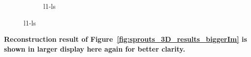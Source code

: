 \documentclass{article}
\begin{document}
\begin{figure}[!h]
    \begin{subfigure}[b]{\linewidth}
\captionsetup{labelformat=empty}
        \caption{\large{l1-ls}}
     \end{subfigure}
\end{figure}
\newpage
\textbf{Reconstruction result of Figure~\ref{fig:sprouts_3D_results_biggerIm}  is shown in larger display here  again for better clarity.}\\
\end{document}
